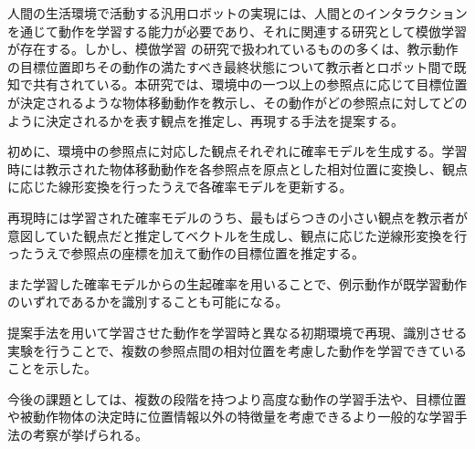 ﻿人間の生活環境で活動する汎用ロボットの実現には、人間とのインタラクションを通じて動作を学習する能力が必要であり、それに関連する研究として模倣学習が存在する。しかし、模倣学習
の研究で扱われているものの多くは、教示動作の目標位置即ちその動作の満たすべき最終状態について教示者とロボット間で既知で共有されている。本研究では、環境中の一つ以上の参照点に応じて目標位置が決定されるような物体移動動作を教示し、その動作がどの参照点に対してどのように決定されるかを表す観点を推定し、再現する手法を提案する。

初めに、環境中の参照点に対応した観点それぞれに確率モデルを生成する。学習時には教示された物体移動動作を各参照点を原点とした相対位置に変換し、観点に応じた線形変換を行ったうえで各確率モデルを更新する。

再現時には学習された確率モデルのうち、最もばらつきの小さい観点を教示者が意図していた観点だと推定してベクトルを生成し、観点に応じた逆線形変換を行ったうえで参照点の座標を加えて動作の目標位置を推定する。

また学習した確率モデルからの生起確率を用いることで、例示動作が既学習動作のいずれであるかを識別することも可能になる。

提案手法を用いて学習させた動作を学習時と異なる初期環境で再現、識別させる実験を行うことで、複数の参照点間の相対位置を考慮した動作を学習できていることを示した。

今後の課題としては、複数の段階を持つより高度な動作の学習手法や、目標位置や被動作物体の決定時に位置情報以外の特徴量を考慮できるより一般的な学習手法の考察が挙げられる。